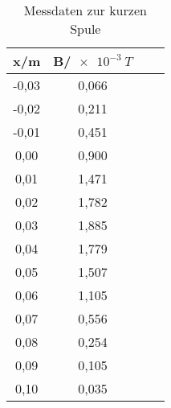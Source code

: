 
\begin{table}
  \centering
  \caption{Messdaten zur kurzen Spule}
  \label{tab:ks}
  \begin{tabular}{c c c c}
    \toprule
     x/m &	 B/$\SI{e-3}{T}$	 \\
    \midrule
    -0,03	& 0,066\\
    -0,02	& 0,211\\
    -0,01	& 0,451\\
     0,00	& 0,900\\
     0,01	& 1,471\\
     0,02	& 1,782\\
     0,03	& 1,885\\
     0,04	& 1,779\\
     0,05	& 1,507\\
     0,06	& 1,105\\
     0,07	& 0,556\\
     0,08	& 0,254\\
     0,09	& 0,105\\
     0,10	& 0,035\\
    \bottomrule
  \end{tabular}
\end{table}
